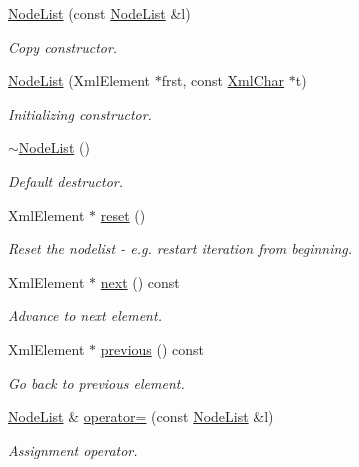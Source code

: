 \begin{DoxyCompactItemize}
\item 
\hyperlink{class_d_d4hep_1_1_x_m_l_1_1_node_list_a26cb6e55d1caaceb8753eb05280a7e46}{Node\+List} (const \hyperlink{class_d_d4hep_1_1_x_m_l_1_1_node_list}{Node\+List} \&l)
\begin{DoxyCompactList}\small\item\em Copy constructor. \end{DoxyCompactList}\item 
\hyperlink{class_d_d4hep_1_1_x_m_l_1_1_node_list_a8711c5612f382425754b2b8d7b01a7dc}{Node\+List} (Xml\+Element $\ast$frst, const \hyperlink{namespace_d_d4hep_1_1_x_m_l_a09e5d9cc86ed782f6826dfe0778c1815}{Xml\+Char} $\ast$t)
\begin{DoxyCompactList}\small\item\em Initializing constructor. \end{DoxyCompactList}\item 
\hyperlink{class_d_d4hep_1_1_x_m_l_1_1_node_list_a77b664c0c6c93d1c6eccbd10581396af}{$\sim$\+Node\+List} ()
\begin{DoxyCompactList}\small\item\em Default destructor. \end{DoxyCompactList}\item 
Xml\+Element $\ast$ \hyperlink{class_d_d4hep_1_1_x_m_l_1_1_node_list_ac1d472d2a7418c4dadf545044143901d}{reset} ()
\begin{DoxyCompactList}\small\item\em Reset the nodelist -\/ e.\+g. restart iteration from beginning. \end{DoxyCompactList}\item 
Xml\+Element $\ast$ \hyperlink{class_d_d4hep_1_1_x_m_l_1_1_node_list_a0cc5561216623c230d943ce6f9c43caa}{next} () const
\begin{DoxyCompactList}\small\item\em Advance to next element. \end{DoxyCompactList}\item 
Xml\+Element $\ast$ \hyperlink{class_d_d4hep_1_1_x_m_l_1_1_node_list_a6ed14334c2084812aa9b8f4b1c8612bd}{previous} () const
\begin{DoxyCompactList}\small\item\em Go back to previous element. \end{DoxyCompactList}\item 
\hyperlink{class_d_d4hep_1_1_x_m_l_1_1_node_list}{Node\+List} \& \hyperlink{class_d_d4hep_1_1_x_m_l_1_1_node_list_a4b07c12f6c886a8400c27797bc85a544}{operator=} (const \hyperlink{class_d_d4hep_1_1_x_m_l_1_1_node_list}{Node\+List} \&l)
\begin{DoxyCompactList}\small\item\em Assignment operator. \end{DoxyCompactList}\end{DoxyCompactItemize}
